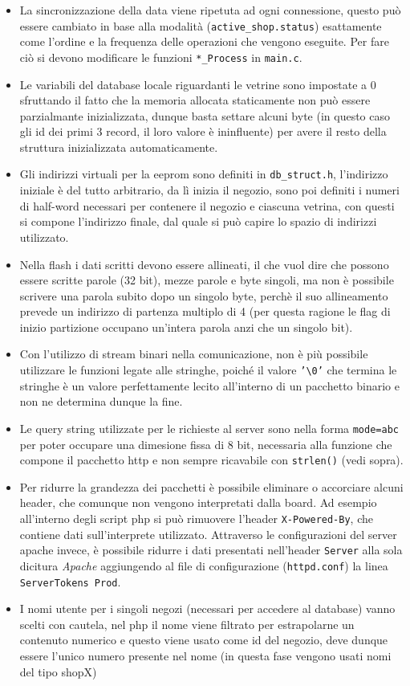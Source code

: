 \begin{itemize}
\item La sincronizzazione della data viene ripetuta ad ogni connessione, questo pu\`o essere cambiato in base alla modalit\`a (\texttt{active\_shop.status}) esattamente come l'ordine e la frequenza delle operazioni che vengono eseguite. Per fare ci\`o si devono modificare le funzioni \texttt{*\_Process} in \texttt{main.c}.
\item Le variabili del database locale riguardanti le vetrine sono impostate a 0 sfruttando il fatto che la memoria allocata staticamente non pu\`o essere parzialmante inizializzata, dunque basta settare alcuni byte (in questo caso gli id dei primi 3 record, il loro valore \`e ininfluente) per avere il resto della struttura inizializzata automaticamente.
\item Gli indirizzi virtuali per la eeprom sono definiti in \texttt{db\_struct.h}, l'indirizzo iniziale \`e del tutto arbitrario, da lì inizia il negozio, sono poi definiti i numeri di half-word necessari per contenere il negozio e ciascuna vetrina, con questi si compone l'indirizzo finale, dal quale si pu\`o capire lo spazio di indirizzi utilizzato.
\item Nella flash i dati scritti devono essere allineati, il che vuol dire che possono essere scritte parole (32 bit), mezze parole e byte singoli, ma non è possibile scrivere una parola subito dopo un singolo byte, perch\`e il suo allineamento prevede un indirizzo di partenza multiplo di 4 (per questa ragione le flag di inizio partizione occupano un'intera parola anzi che un singolo bit).
\item Con l'utilizzo di stream binari nella comunicazione, non \`e pi\`u possibile utilizzare le funzioni legate alle stringhe, poich\'e il valore \texttt{'\textbackslash 0'} che termina le stringhe \`e un valore perfettamente lecito all'interno di un pacchetto binario e non ne determina dunque la fine.
\item Le query string utilizzate per le richieste al server sono nella forma \texttt{mode=abc} per poter occupare una dimesione fissa di 8 bit, necessaria alla funzione che compone il pacchetto http e non sempre ricavabile con \texttt{strlen()} (vedi sopra).
\item Per ridurre la grandezza dei pacchetti \`e possibile eliminare o accorciare alcuni header, che comunque non vengono interpretati dalla board. Ad esempio all'interno degli script php si pu\`o rimuovere l'header \texttt{X-Powered-By}, che contiene dati sull'interprete utilizzato. Attraverso le configurazioni del server apache invece, \`e possibile ridurre i dati presentati nell'header \texttt{Server} alla sola dicitura \textit{Apache} aggiungendo al file di configurazione (\texttt{httpd.conf}) la linea \texttt{ServerTokens Prod}.
\item I nomi utente per i singoli negozi (necessari per accedere al database) vanno scelti con cautela, nel php il nome viene filtrato per estrapolarne un contenuto numerico e questo viene usato come id del negozio, deve dunque essere l'unico numero presente nel nome (in questa fase vengono usati nomi del tipo shopX)
\end{itemize}
